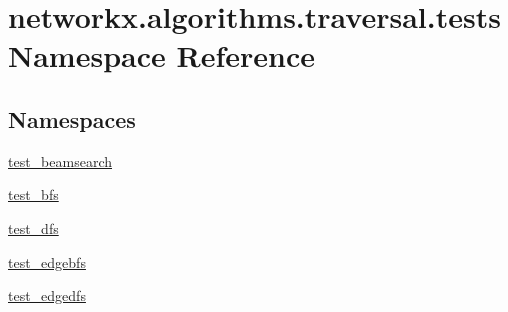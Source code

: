 \hypertarget{namespacenetworkx_1_1algorithms_1_1traversal_1_1tests}{}\section{networkx.\+algorithms.\+traversal.\+tests Namespace Reference}
\label{namespacenetworkx_1_1algorithms_1_1traversal_1_1tests}
\subsection*{Namespaces}
\begin{DoxyCompactItemize}
\item 
 \hyperlink{namespacenetworkx_1_1algorithms_1_1traversal_1_1tests_1_1test__beamsearch}{test\+\_\+beamsearch}
\item 
 \hyperlink{namespacenetworkx_1_1algorithms_1_1traversal_1_1tests_1_1test__bfs}{test\+\_\+bfs}
\item 
 \hyperlink{namespacenetworkx_1_1algorithms_1_1traversal_1_1tests_1_1test__dfs}{test\+\_\+dfs}
\item 
 \hyperlink{namespacenetworkx_1_1algorithms_1_1traversal_1_1tests_1_1test__edgebfs}{test\+\_\+edgebfs}
\item 
 \hyperlink{namespacenetworkx_1_1algorithms_1_1traversal_1_1tests_1_1test__edgedfs}{test\+\_\+edgedfs}
\end{DoxyCompactItemize}
